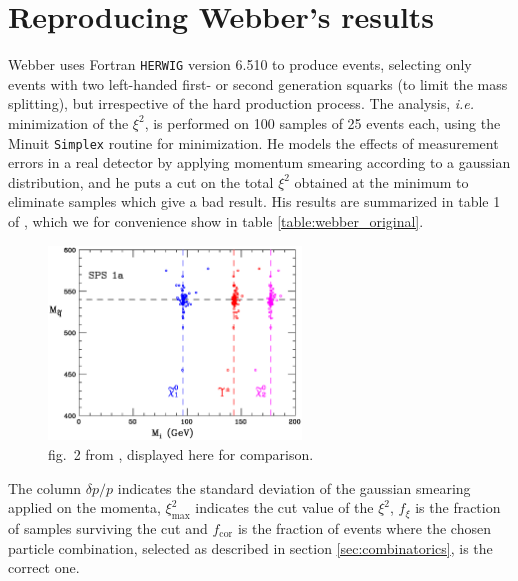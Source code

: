 \documentclass[twoside,english]{uiofysmaster}
\begin{document}
\section{Reproducing Webber's results}
Webber uses Fortran {\tt HERWIG} version 6.510 \cite{Corcella:2000bw,Moretti:2002eu} to produce events, selecting only events with two left-handed first- or second generation squarks (to limit the mass splitting), but irrespective of the hard production process. The analysis, {\it i.e.} minimization of the $\xi^2$, is performed on 100 samples of 25 events each, using the Minuit {\tt Simplex} \cite{James:1975dr} routine for minimization. He models the effects of measurement errors in a real detector by applying momentum smearing according to a gaussian distribution, and he puts a cut on the total $\xi^2$ obtained at the minimum to eliminate samples which give a bad result. His results are summarized in table 1 of \cite{Webber:2009vm}, which we for convenience show in table \ref{table:webber_original}. 
\begin{figure}[hbt]
	\centering
	\includegraphics[width=0.6\textwidth]{figures/webber_rec_table/sps1a_fits.eps} 
	\caption{fig.\ 2 from \cite{Webber:2009vm}, displayed here for comparison.}
	\label{fig:webber_scatter}
\end{figure}
The column $\delta p/p$ indicates the standard deviation of the gaussian smearing applied on the momenta, $\xi^2_\mathrm{max}$ indicates the cut value of the $\xi^2$, $f_\xi$ is the fraction of samples surviving the cut and $f_\mathrm{cor}$ is the fraction of events where the chosen particle combination, selected as described in section \ref{sec:combinatorics}, is the correct one. 
\end{document}
